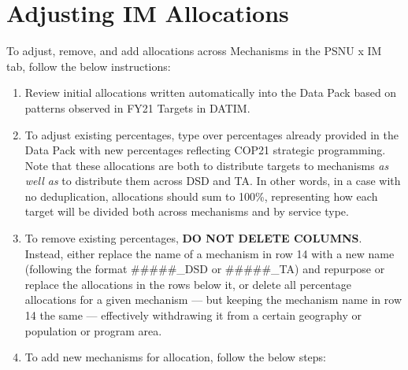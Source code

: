 \documentclass[
  openany]{book}
\begin{document}
\hypertarget{adjusting-im-allocations}{%
\section{Adjusting IM Allocations}\label{adjusting-im-allocations}}

To adjust, remove, and add allocations across Mechanisms in the PSNU x
IM tab, follow the below instructions:

\begin{enumerate}
\def\labelenumi{\arabic{enumi})}
\item
  Review initial allocations written automatically into the Data Pack
  based on patterns observed in FY21 Targets in DATIM.
\item
  To adjust existing percentages, type over percentages already
  provided in the Data Pack with new percentages reflecting COP21
  strategic programming. Note that these allocations are both to
  distribute targets to mechanisms \emph{as well as} to distribute them
  across DSD and TA. In other words, in a case with no deduplication,
  allocations should sum to 100\%, representing how each target will be
  divided both across mechanisms and by service type.
\item
  To remove existing percentages, \textbf{DO NOT DELETE COLUMNS}. Instead,
  either replace the name of a mechanism in row 14 with a new name
  (following the format \#\#\#\#\#\_DSD or \#\#\#\#\#\_TA) and
  repurpose or replace the allocations in the rows below it, or delete
  all percentage allocations for a given mechanism --- but keeping the
  mechanism name in row 14 the same --- effectively withdrawing it
  from a certain geography or population or program area.
\item
  To add new mechanisms for allocation, follow the below steps:


\end{enumerate}
\end{document}
